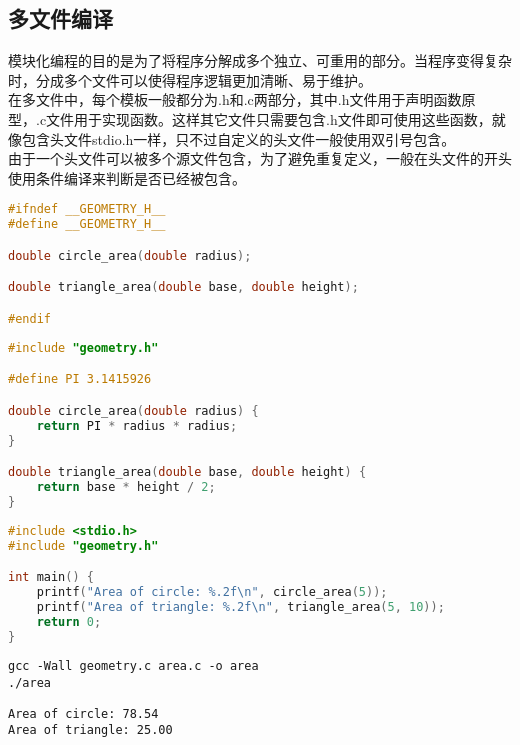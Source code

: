 \vspace{0.5cm}

\subsection{多文件编译}

模块化编程的目的是为了将程序分解成多个独立、可重用的部分。当程序变得复杂时，分成多个文件可以使得程序逻辑更加清晰、易于维护。\\

在多文件中，每个模板一般都分为.h和.c两部分，其中.h文件用于声明函数原型，.c文件用于实现函数。这样其它文件只需要包含.h文件即可使用这些函数，就像包含头文件stdio.h一样，只不过自定义的头文件一般使用双引号包含。\\

由于一个头文件可以被多个源文件包含，为了避免重复定义，一般在头文件的开头使用条件编译来判断是否已经被包含。\\


\begin{lstlisting}[language=C, title=geometry.h]
#ifndef __GEOMETRY_H__
#define __GEOMETRY_H__

double circle_area(double radius);

double triangle_area(double base, double height);

#endif
\end{lstlisting}

\begin{lstlisting}[language=C, title=geometry.c]
#include "geometry.h"

#define PI 3.1415926

double circle_area(double radius) {
    return PI * radius * radius;
}

double triangle_area(double base, double height) {
    return base * height / 2;
}
\end{lstlisting}

\begin{lstlisting}[language=C, title=area.c]
#include <stdio.h>
#include "geometry.h"

int main() {
    printf("Area of circle: %.2f\n", circle_area(5));
    printf("Area of triangle: %.2f\n", triangle_area(5, 10));
    return 0;
}
\end{lstlisting}

\vspace{-0.5cm}

\begin{lstlisting}
gcc -Wall geometry.c area.c -o area
./area
\end{lstlisting}

\begin{tcolorbox}
    \begin{verbatim}
Area of circle: 78.54
Area of triangle: 25.00
	\end{verbatim}
\end{tcolorbox}

\newpage